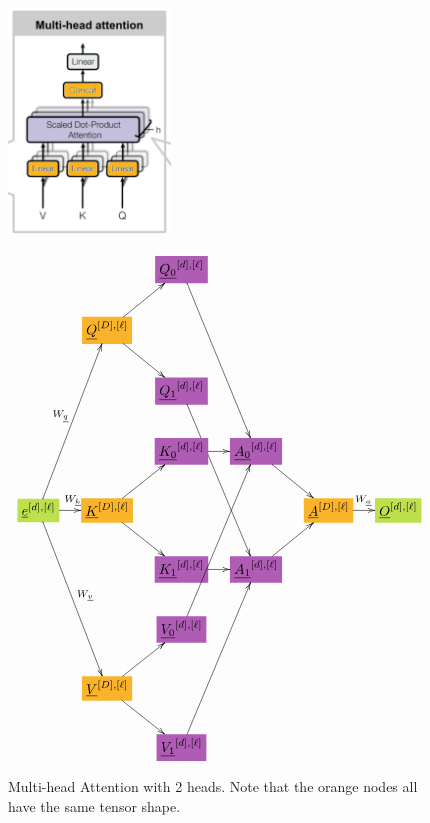 \begin{figure}[!h]\centering
\begin{minipage}{.3\linewidth}
\includegraphics[width=1.7in]{transformer/multi-head-att.png}
\end{minipage}%
\begin{minipage}{.7\linewidth}
$$\xymatrix@C=1.3pc{
&&*+[F*:Orchid]{\underline{Q_0}^{[d],[\ell]}}\ar[dddr]&&&
\\
&*+[F*:Dandelion]{\underline{Q}^{[D], [\ell]}}\ar[ur]\ar[dr]&&&&
\\
&&*+[F*:Orchid]{\underline{Q_1}^{[d],[\ell]}}\ar[dddr]&&&
\\
&&*+[F*:Orchid]{\underline{K_0}^{[d],[\ell]}}\ar[r]&*+[F*:Orchid]{\underline{A_0}^{[d],[\ell]}}\ar[dr]&&
\\
*+[F*:SpringGreen]{\underline{e}^{[d], [\ell]}}\ar[r]^{W_\rvk}\ar[uuur]^{W_\rvq}\ar[dddr]^{W_\rvv}&*+[F*:Dandelion]{\underline{K}^{[D], [\ell]}}\ar[ur]\ar[dr]&&&*+[F*:Dandelion]{\underline{A}^{[D],[\ell]}}\ar[r]^{W_\rva}&*+[F*:SpringGreen]{\underline{O}^{[d],[\ell]}}
\\
&&*+[F*:Orchid]{\underline{K_1}^{[d],[\ell]}}\ar[r]&*+[F*:Orchid]{\underline{A_1}^{[d],[\ell]}}\ar[ur]&&
\\
&&*+[F*:Orchid]{\underline{V_0}^{[d],[\ell]}}\ar[uuur]&&&
\\
&*+[F*:Dandelion]{\underline{V}^{[D], [\ell]}}\ar[ur]\ar[dr]&&&&
\\
&&*+[F*:Orchid]{\underline{V_1}^{[d],[\ell]}}\ar[uuur]&&&
}$$
\end{minipage}
\caption{Multi-head Attention with 2 heads. Note that the orange nodes all have the same tensor shape.}
\label{fig-texnn-for-multi-head-att}
\end{figure}

